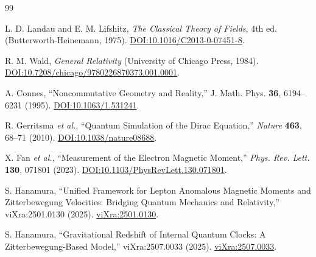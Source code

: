 \documentclass[%
 reprint,
 amsmath,amssymb,
 aps,
]{revtex4-1}
\numberwithin{equation}{section}%
\begin{document}
\begin{thebibliography}{99}

L. D. Landau and E. M. Lifshitz, \textit{The Classical Theory of Fields}, 4th ed. (Butterworth-Heinemann, 1975). \href{https://doi.org/10.1016/C2013-0-07451-8}{DOI:10.1016/C2013-0-07451-8}.

R. M. Wald, \textit{General Relativity} (University of Chicago Press, 1984). \href{https://doi.org/10.7208/chicago/9780226870373.001.0001}{DOI:10.7208/chicago/9780226870373.001.0001}.

A. Connes, ``Noncommutative Geometry and Reality,'' J. Math. Phys. \textbf{36}, 6194--6231 (1995). \href{https://doi.org/10.1063/1.531241}{DOI:10.1063/1.531241}.

R. Gerritsma \textit{et al.}, ``Quantum Simulation of the Dirac Equation,'' \textit{Nature} \textbf{463}, 68--71 (2010). \href{https://doi.org/10.1038/nature08688}{DOI:10.1038/nature08688}.

X. Fan \textit{et al.}, ``Measurement of the Electron Magnetic Moment,'' \textit{Phys. Rev. Lett.} \textbf{130}, 071801 (2023). \href{https://doi.org/10.1103/PhysRevLett.130.071801}{DOI:10.1103/PhysRevLett.130.071801}.

S. Hanamura, ``Unified Framework for Lepton Anomalous Magnetic Moments and Zitterbewegung Velocities: Bridging Quantum Mechanics and Relativity,'' viXra:2501.0130 (2025). \href{https://vixra.org/abs/2501.0130}{viXra:2501.0130}.


S. Hanamura, ``Gravitational Redshift of Internal Quantum Clocks: A Zitterbewegung-Based Model,'' viXra:2507.0033 (2025). \href{https://vixra.org/abs/2507.0033}{viXra:2507.0033}.


\end{thebibliography}
\end{document}
